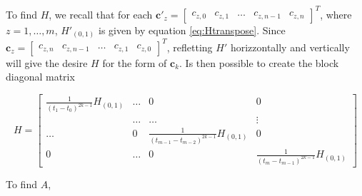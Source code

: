 \noindent To find $H$, we recall that for each $\mathbf{c}'_z=\begin{bmatrix}c_{z,0} & c_{z,1} & \dots & c_{z,n-1} & c_{z,n} \end{bmatrix}^T$, where $z=1,\dots,m$, $H'_{(0,1)}$ is given by equation \eqref{eq:Htranspose}. Since $\mathbf{c}_z=\begin{bmatrix}c_{z,n} & c_{z,n-1} & \dots & c_{z,1} & c_{z,0}\end{bmatrix}^T$, refletting $H'$ horizzontally and vertically will give the desire $H$ for the form of $\mathbf{c}_k$. Is then possible to create the block diagonal matrix 

\begin{equation}
	H = 
	\begin{bmatrix}
		\frac{1}{(t_1-t_0)^{2k-1}}H_{(0,1)} & \dots & 0 & 0 \\
		 & \dots & \dots & \vdots \\
		\dots & 0 & \frac{1}{(t_{m-1}-t_{m-2})^{2k-1}}H_{(0,1)} & 0 \\
		0 & \dots & 0 & \frac{1}{(t_m-t_{m-1})^{2k-1}}H_{(0,1)}
	\end{bmatrix}	
\end{equation}

\noindent To find $A$,